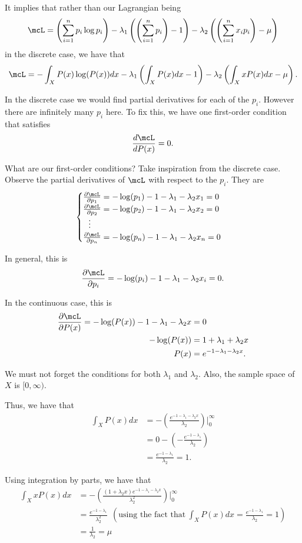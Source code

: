 \documentclass[a4paper, 12pt,oneside,openany]{book}
\begin{document}
It implies that rather than our Lagrangian being $$\mcL =\left(\sum\limits_{i=1}^n p_i \log p_i\right) - \lambda_1\left(\left(\sum\limits_{i=1}^n p_i\right)-1\right) - \lambda_2\left(\left(\sum\limits_{i=1}^n x_ip_i\right)-\mu\right)$$ in the discrete case, we have that $$\mcL = -\int_X P(x) \log (P(x))dx - \lambda_1\left(\int_X P(x) dx-1\right) - \lambda_2\left(\int_X xP(x) dx-\mu\right).$$

In the discrete case we would find partial derivatives for each of the $p_i$. However there are infinitely many $p_i$ here. To fix this, we have one first-order condition that satisfies $$\frac{d\mcL}{d P(x)} =0.$$

What are our first-order conditions? Take inspiration from the discrete case. Observe the partial derivatives of $\mcL$ with respect to the $p_i$. They are 
$$	\begin{cases}
	\frac{\partial \mcL}{\partial p_1} = -\log(p_1)-1-\lambda_1-\lambda_2x_1=0 \\
	\frac{\partial \mcL}{\partial p_2} = -\log(p_2)-1-\lambda_1-\lambda_2x_2=0 \\
	\ \ \vdots \\
	\frac{\partial \mcL}{\partial p_n} = -\log(p_n)-1-\lambda_1-\lambda_2x_n=0 \\
	\end{cases}
$$

In general, this is $$\frac{\partial \mcL}{\partial p_i} = -\log(p_i)-1-\lambda_1-\lambda_2x_i=0.$$

In the continuous case, this is \begin{align*} \frac{\partial \mcL}{\partial P(x)}=-\log (P(x)) - 1 - \lambda_1-\lambda_2 x&=0 \\ -\log(P(x)) &= 1+\lambda_1+\lambda_2x  \\ P(x) &= e^{-1-\lambda_1-\lambda_2x}. \end{align*}

We must not forget the conditions for both $\lambda_1$ and $\lambda_2$. Also, the sample space of $X$ is $[0, \infty)$.

Thus, we have that \begin{align*} \int_X P(x) dx &= -\left(\frac{e^{-1-\lambda_1-\lambda_2 x}}{\lambda_2}\right) \Big|^\infty_0 \\ &= 0-(-\frac{e^{-1-\lambda_1}}{\lambda_2})\\&=\frac{e^{-1-\lambda_1}}{\lambda_2}=1. \end{align*}

Using integration by parts, we have that \begin{align*} \int_X xP(x) dx &= -\left(\frac{(1+\lambda_2 x)e^{-1-\lambda_1-\lambda_2 x}}{\lambda_2^2}\right) \Big|^\infty_0 \\ &= \frac{e^{-1-\lambda_1}}{\lambda^2_2} \ \  \left(\text{using the fact that}\ \int_X P(x) dx = \frac{e^{-1-\lambda_1}}{\lambda_2}=1\right) \\ &= \frac{1}{\lambda_2} = \mu\end{align*}
\end{document}
